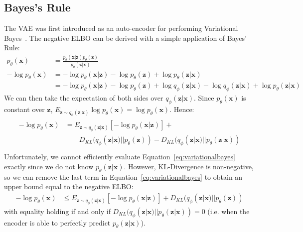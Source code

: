 \documentclass{article}
\begin{document}
\subsection{Bayes's Rule}
\label{sec:bayes}
The VAE was first introduced as an auto-encoder for performing Variational Bayes~\cite{vae}. The negative ELBO can be derived with a simple application of Bayes' Rule:
\begin{align}
    p_\theta(\mathbf{x}) &= \frac{p_\theta(\mathbf{x}|\mathbf{z})p_\theta(\mathbf{z})}{p_\theta(\mathbf{z}|\mathbf{x})}\\
     -\log p_\theta(\mathbf{x}) &= -\log p_\theta(\mathbf{x}|\mathbf{z}) - \log  p_\theta(\mathbf{z}) + \log p_\theta(\mathbf{z}|\mathbf{x})\\
     &=  -\log p_\theta(\mathbf{x}|\mathbf{z}) - \log  p_\theta(\mathbf{z}) + \log q_\phi(\mathbf{z}|\mathbf{x}) - \log q_\phi(\mathbf{z}|\mathbf{x}) + \log p_\theta(\mathbf{z}|\mathbf{x}) \label{eq:addsubtractq}
\end{align}
We can then take the expectation of both sides over $q_\phi(\mathbf{z}|\mathbf{x})$. Since $p_\theta(\mathbf{x})$ is constant over $\mathbf{z}$, $E_{\mathbf{z}\sim q_\phi(\mathbf{z}|\mathbf{x})} \log p_\theta(\mathbf{x}) = \log p_\theta(\mathbf{x})$. Hence:
\begin{align}
     \begin{split}
         -\log p_\theta(\mathbf{x}) &= E_{\mathbf{z}\sim q_\phi(\mathbf{z}|\mathbf{x})} [-\log p_\theta(\mathbf{x}|\mathbf{z})] +\\
         &\qquad D_{KL}( q_\phi(\mathbf{z}|\mathbf{x}) ||   p_\theta(\mathbf{z})) - D_{KL}(q_\phi(\mathbf{z}|\mathbf{x}) || p_\theta(\mathbf{z}|\mathbf{x}))\\
     \end{split} \label{eq:variationalbayes}
\end{align}
Unfortunately, we cannot efficiently evaluate Equation~\ref{eq:variationalbayes} exactly since  we do not know $p_\theta(\mathbf{z}|\mathbf{x})$.
However, KL-Divergence is non-negative, so we can remove the last term in Equation~\ref{eq:variationalbayes} to obtain an upper bound equal to the negative ELBO:
\begin{align}
     -\log p_\theta(\mathbf{x}) &\leq E_{\mathbf{z}\sim q_\phi(\mathbf{z}|\mathbf{x})} [-\log p_\theta(\mathbf{x}|\mathbf{z})] +
          D_{KL}( q_\phi(\mathbf{z}|\mathbf{x}) ||   p_\theta(\mathbf{z}))
\end{align}
with equality holding if and only if $D_{KL}(q_\phi(\mathbf{z}|\mathbf{x}) ||  p_\theta(\mathbf{z}|\mathbf{x})) = 0$ (i.e. when the encoder is able to perfectly predict $p_\theta(\mathbf{z}|\mathbf{x})$).
\end{document}
